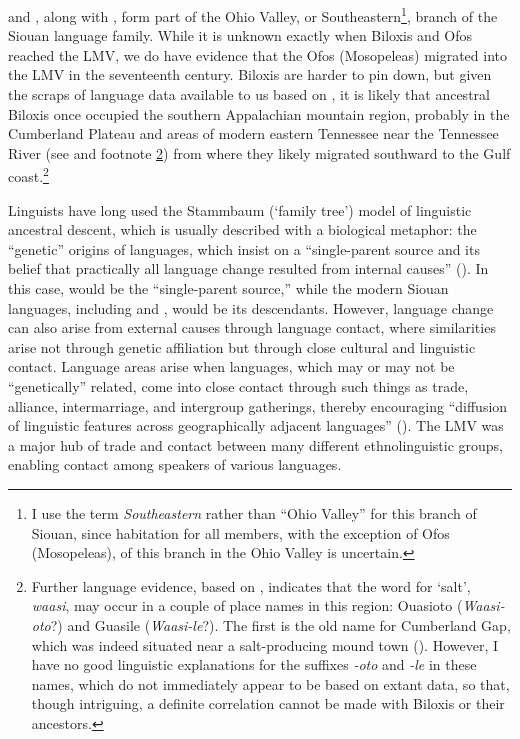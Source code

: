 \documentclass[output=paper]{LSP/langsci}
\begin{document}
 and , along with , form part of the Ohio Valley, or Southeastern\footnote{I use the term \emph{Southeastern} rather than “Ohio Valley” for this branch of Siouan, since habitation for all members, with the exception of Ofos (Mosopeleas), of this branch in the Ohio Valley is uncertain.}, branch of the Siouan language family. While it is unknown exactly when Biloxis and Ofos reached the LMV, we do have evidence that the Ofos (Mosopeleas) migrated into the LMV in the seventeenth century. Biloxis are harder to pin down, but given the scraps of language data available to us based on , it is likely that ancestral Biloxis once occupied the southern Appalachian mountain region, probably in the Cumberland Plateau and areas of modern eastern Tennessee near the Tennessee River (see \citealt{Rankin2011} and footnote \ref{waasi}) from where they likely migrated southward to the Gulf coast.\footnote{\label{waasi}Further language evidence, based on , indicates that the  word for `salt', \emph{waasi}, may occur in a couple of place names in this region: Ouasioto (\emph{Waasi-oto}?) and Guasile (\emph{Waasi-le}?). The first is the old name for Cumberland Gap, which was indeed situated near a salt-producing mound town (\citealt{Meyer1925}). However, I have no good linguistic explanations for the suffixes \emph{-oto} and \emph{-le} in these names, which do not immediately appear to be  based on extant data, so that, though intriguing, a definite correlation cannot be made with Biloxis or their ancestors.}

Linguists have long used the Stammbaum (`family tree') model of linguistic ancestral descent, which is usually described with a biological metaphor: the “genetic” origins of languages, which insist on a “single-parent source and its belief that practically all language change resulted from internal causes” (\citealt[7]{Winford2003}). In this case,  would be the “single-parent source,” while the modern Siouan languages, including  and , would be its descendants. However, language change can also arise from external causes through language contact, where similarities arise not through genetic affiliation but through close cultural and linguistic contact. Language areas arise when languages, which may or may not be “genetically” related, come into close contact through such things as trade, alliance, intermarriage, and intergroup gatherings, thereby encouraging “diffusion of linguistic features across geographically adjacent languages” (\citealt[7]{Winford2003}). The LMV was a major hub of trade and contact between many different ethnolinguistic groups, enabling contact among speakers of various languages. 
\end{document}
